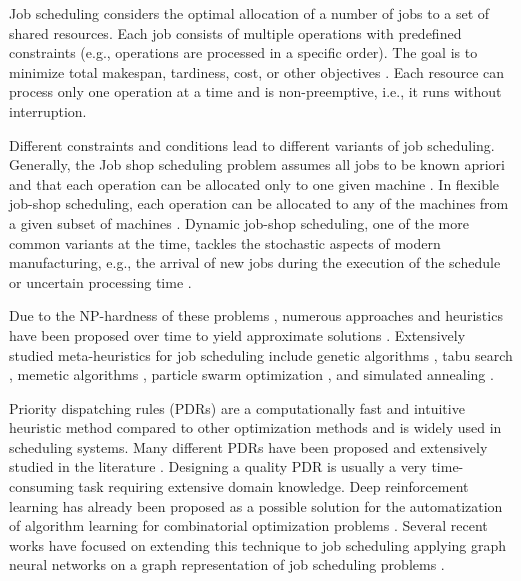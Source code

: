 

Job scheduling considers the optimal allocation of a number of jobs to a set of shared resources. Each job consists of multiple operations with predefined constraints (e.g., operations are processed in a specific order). The goal is to minimize total makespan, tardiness, cost, or other objectives \cite{YamadaNakanoJSSP}. Each resource can process only one operation at a time and is non-preemptive, i.e., it runs without interruption.
\par
Different constraints and conditions lead to different variants of job scheduling. 
Generally, the Job shop scheduling problem assumes all jobs to be known apriori and that each operation can be allocated only to one given machine \cite{YamadaNakanoJSSP}. In flexible job-shop scheduling, each operation can be allocated to any of the machines from a given subset of machines \cite{DAUZEREPERES2024409}. Dynamic job-shop scheduling, one of the more common variants at the time, tackles the stochastic aspects of modern manufacturing, e.g., the arrival of new jobs during the execution of the schedule or uncertain processing time \cite{MOHAN201934}.
\par
Due to the NP-hardness of these problems \cite{Garey1976TheCO}, numerous approaches and heuristics have been proposed over time to yield approximate solutions \cite{Jansen2000ApproximationAF}. Extensively studied meta-heuristics for job scheduling include genetic algorithms \cite{PEZZELLA20083202, zhang2011effective}, tabu search \cite{Brandimarte_1993}, memetic algorithms \cite{frutos2010memetic}, particle swarm optimization \cite{ZHANG20091309}, and simulated annealing \cite{Yamada1996}.
\par
Priority dispatching rules (PDRs) \cite{Haupt1989ASO} are a computationally fast and intuitive heuristic method compared to other optimization methods and is widely used in scheduling systems. Many different PDRs have been proposed and extensively studied in the literature \cite{doi:10.1080/00207543.2011.611539}. Designing a quality PDR is usually a very time-consuming task requiring extensive domain knowledge. Deep reinforcement learning has already been proposed as a possible solution for the automatization of algorithm learning for combinatorial optimization problems \cite{bengio2020machine}. Several recent works have focused on extending this technique to job scheduling \cite{zhang2020learning, https://doi.org/10.1002/tee.23788, DBLP:journals/corr/abs-2106-01086, 10114974, 9826438, 10226873} applying graph neural networks on a graph representation of job scheduling problems \cite{BLAZEWICZ2000317}.\\
